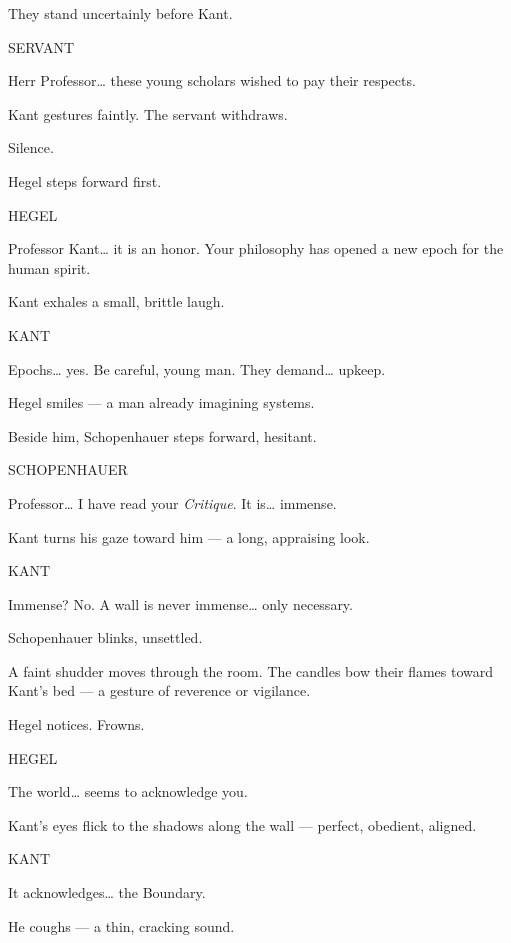 \documentclass[12pt]{article}
\newenvironment{dialogue}[1]{%
  \vspace{0.8\baselineskip}%
  \noindent\hspace*{2.3in}\textsc{#1}\par%
  \noindent\hspace*{1.5in}\begin{minipage}[t]{4.5in}%
}{%
  \end{minipage}\par%
}
\begin{document}
They stand uncertainly before Kant.

\begin{dialogue}{SERVANT}
Herr Professor… these young scholars wished to pay their respects.
\end{dialogue}

Kant gestures faintly.
The servant withdraws.

Silence.

Hegel steps forward first.

\begin{dialogue}{HEGEL}
Professor Kant… it is an honor.
Your philosophy has opened a new epoch for the human spirit.
\end{dialogue}

Kant exhales a small, brittle laugh.

\begin{dialogue}{KANT}
Epochs… yes.
Be careful, young man.
They demand… upkeep.
\end{dialogue}

Hegel smiles — a man already imagining systems.

Beside him, Schopenhauer steps forward, hesitant.

\begin{dialogue}{SCHOPENHAUER}
Professor…
I have read your \textit{Critique}.
It is…
immense.
\end{dialogue}

Kant turns his gaze toward him — a long, appraising look.

\begin{dialogue}{KANT}
Immense?
No.
A wall is never immense…
only necessary.
\end{dialogue}

Schopenhauer blinks, unsettled.

A faint shudder moves through the room.
The candles bow their flames toward Kant’s bed —
a gesture of reverence or vigilance.

Hegel notices.
Frowns.

\begin{dialogue}{HEGEL}
The world… seems to acknowledge you.
\end{dialogue}

Kant’s eyes flick to the shadows along the wall —
perfect, obedient, aligned.

\begin{dialogue}{KANT}
It acknowledges… the Boundary.
\end{dialogue}

He coughs — a thin, cracking sound.
\end{document}
